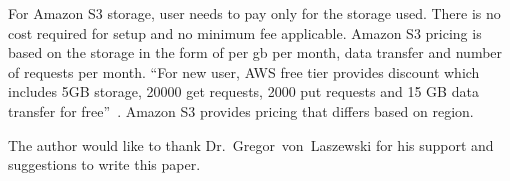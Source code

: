 For Amazon S3 storage, user needs to pay only for the storage used. There is no
cost required for setup and no minimum fee applicable. Amazon S3 pricing is
based on the storage in the form of per gb per month, data transfer and number
of requests per month.
``For new user, AWS free tier provides discount which includes 5GB storage,
20000 get requests, 2000 put requests and 15 GB data transfer for
free''~\cite{hid-sp18-420-amazon-S3-pricing}. Amazon S3 provides pricing that
differs based on region.


\begin{acks}

  The author would like to thank Dr.~Gregor~von~Laszewski for his
  support and suggestions to write this paper.

\end{acks}


 
